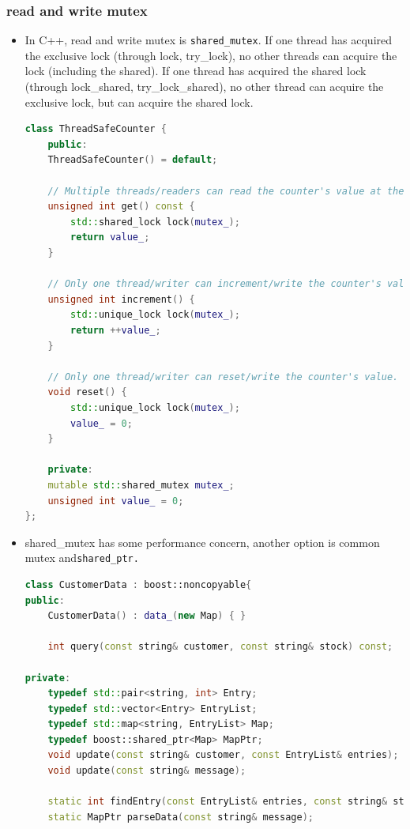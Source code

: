\documentclass[a4paper,11pt,twoside]{book}
\begin{document}
\subsubsection{read and write mutex}

\begin{itemize}

    \item In C++, read and write mutex is \texttt{shared\_mutex}. If one thread has acquired the exclusive lock (through lock, try\_lock), no other threads can acquire the lock (including the shared). If one thread has acquired the shared lock (through lock\_shared, try\_lock\_shared), no other thread can acquire the exclusive lock, but can acquire the shared lock.

\begin{lstlisting}[frame=single, language=c++]	
class ThreadSafeCounter {
	public:
	ThreadSafeCounter() = default;
	
	// Multiple threads/readers can read the counter's value at the same time.
	unsigned int get() const {
		std::shared_lock lock(mutex_);
		return value_;
	}
	
	// Only one thread/writer can increment/write the counter's value.
	unsigned int increment() {
		std::unique_lock lock(mutex_);
		return ++value_;
	}
	
	// Only one thread/writer can reset/write the counter's value.
	void reset() {
		std::unique_lock lock(mutex_);
		value_ = 0;
	}
	
	private:
	mutable std::shared_mutex mutex_;
	unsigned int value_ = 0;
};	
\end{lstlisting}

    \item shared\_mutex has some performance concern, another option is common mutex and\texttt{shared\_ptr.}

\begin{lstlisting}[frame=single, language=c++]	
class CustomerData : boost::noncopyable{
public:
	CustomerData() : data_(new Map) { }
	
	int query(const string& customer, const string& stock) const;
	
private:
	typedef std::pair<string, int> Entry;
	typedef std::vector<Entry> EntryList;
	typedef std::map<string, EntryList> Map;
	typedef boost::shared_ptr<Map> MapPtr;
	void update(const string& customer, const EntryList& entries);
	void update(const string& message);
	
	static int findEntry(const EntryList& entries, const string& stock);
	static MapPtr parseData(const string& message);
	

\end{lstlisting}
\end{itemize}
\end{document}
